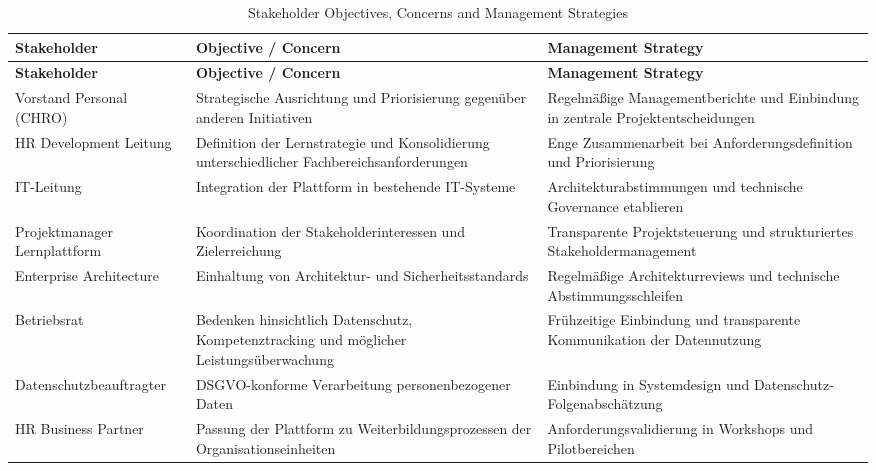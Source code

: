 \begin{xltabular}{\textwidth}{@{}>{\hsize}X>{\hsize}X>{\hsize}X@{}}
	\caption{Stakeholder Objectives, Concerns and Management Strategies} \label{tab:stakeholder-management} \\
	\hline
	\textbf{Stakeholder} & \textbf{Objective / Concern} & \textbf{Management Strategy} \\
	\hline
	\endfirsthead

	\hline
	\textbf{Stakeholder} & \textbf{Objective / Concern} & \textbf{Management Strategy} \\
	\hline
	\endhead

	\hline
	\endfoot

	Vorstand Personal (\acs{CHRO}) &
	Strategische Ausrichtung und Priorisierung gegenüber anderen Initiativen &
	Regelmäßige Managementberichte und Einbindung in zentrale Projektentscheidungen \\

	\acs{HR} Development Leitung &
	Definition der Lernstrategie und Konsolidierung unterschiedlicher Fachbereichsanforderungen &
	Enge Zusammenarbeit bei Anforderungsdefinition und Priorisierung \\

	\acs{IT}-Leitung &
	Integration der Plattform in bestehende \acs{IT}-Systeme &
	Architekturabstimmungen und technische Governance etablieren \\

	Projektmanager Lernplattform &
	Koordination der Stakeholderinteressen und Zielerreichung &
	Transparente Projektsteuerung und strukturiertes Stakeholdermanagement \\

	Enterprise Architecture &
	Einhaltung von Architektur- und Sicherheitsstandards &
	Regelmäßige Architekturreviews und technische Abstimmungsschleifen \\

	Betriebsrat &
	Bedenken hinsichtlich Datenschutz, Kompetenztracking und möglicher Leistungsüberwachung &
	Frühzeitige Einbindung und transparente Kommunikation der Datennutzung \\

	Datenschutz\-beauftragter &
	\ac{DSGVO}-konforme Verarbeitung personenbezogener Daten &
	Einbindung in Systemdesign und Datenschutz-Folgenabschätzung \\

	\acs{HR} Business Partner &
	Passung der Plattform zu Weiterbildungsprozessen der Organisationseinheiten &
	Anforderungsvalidierung in Workshops und Pilotbereichen \\


\end{xltabular}

